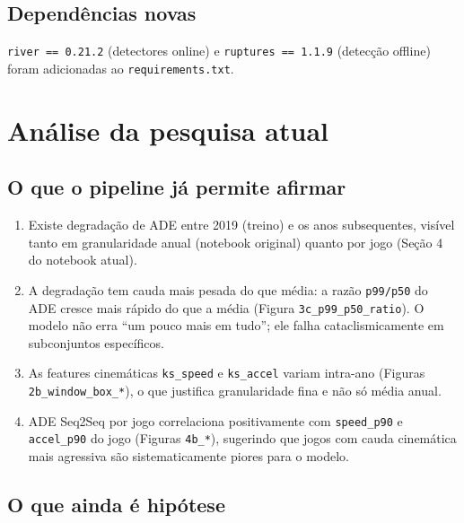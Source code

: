 \documentclass[11pt,a4paper]{article}
\begin{document}
\subsection{Dependências novas}

\texttt{river == 0.21.2} (detectores online) e
\texttt{ruptures == 1.1.9} (detec\c{c}\~ao offline) foram adicionadas
ao \texttt{requirements.txt}.

\section{An\'alise da pesquisa atual}

\subsection{O que o pipeline j\'a permite afirmar}

\begin{enumerate}[leftmargin=1.6em,itemsep=2pt]
    \item Existe degrada\c{c}\~ao de ADE entre 2019 (treino) e os anos
          subsequentes, vis\'ivel tanto em granularidade anual
          (notebook original) quanto por jogo (Se\c{c}\~ao 4 do notebook
          atual).
    \item A degrada\c{c}\~ao tem cauda mais pesada do que m\'edia: a
          raz\~ao \texttt{p99/p50} do ADE cresce mais r\'apido do que a
          m\'edia (Figura \texttt{3c\_p99\_p50\_ratio}). O modelo n\~ao
          erra ``um pouco mais em tudo''; ele falha cataclismicamente em
          subconjuntos espec\'ificos.
    \item As features cinem\'aticas \texttt{ks\_speed} e
          \texttt{ks\_accel} variam intra-ano (Figuras
          \texttt{2b\_window\_box\_*}), o que justifica granularidade
          fina e n\~ao s\'o m\'edia anual.
    \item ADE Seq2Seq por jogo correlaciona positivamente com
          \texttt{speed\_p90} e \texttt{accel\_p90} do jogo
          (Figuras \texttt{4b\_*}), sugerindo que jogos com cauda
          cinem\'atica mais agressiva s\~ao sistematicamente piores
          para o modelo.
\end{enumerate}

\subsection{O que ainda \'e hip\'otese}
\end{document}
